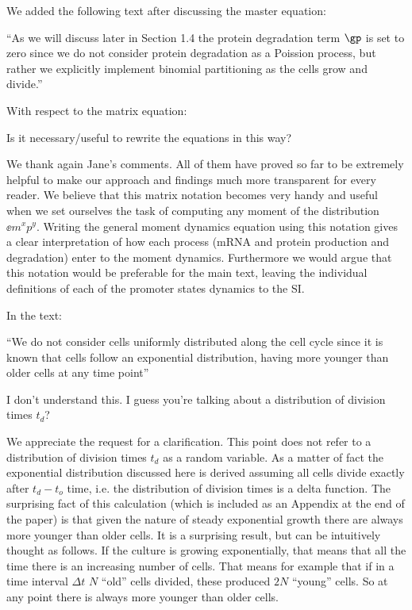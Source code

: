 We added the following text after discussing the master equation:

``As we will discuss later in Section 1.4 the protein degradation term $\gp$ is
set to zero since we do not consider protein degradation as a Poission process,
but rather we explicitly implement binomial partitioning as the cells grow and
divide.''

\begin{tcolorbox}
With respect to the matrix equation:

Is it necessary/useful to rewrite the equations in this way?
\end{tcolorbox}

We thank again Jane's comments. All of them have proved so far to be extremely
helpful to make our approach and findings much more transparent for every
reader. We believe that this matrix notation becomes very handy and useful when
we set ourselves the task of computing any moment of the distribution $\ee{m^x
p^y}$. Writing the general moment dynamics equation using this notation gives a
clear interpretation of how each process (mRNA and protein production and
degradation) enter to the moment dynamics. Furthermore we would argue that this
notation would be preferable for the main text, leaving the individual
definitions of each of the promoter states dynamics to the SI.

\begin{tcolorbox}
In the text:

``We do not consider cells uniformly distributed along the cell cycle since it
is known that cells follow an exponential distribution, having more younger than
older cells at any time point''

I don't understand this. I guess you're talking about a distribution of division
times $t_d$?
\end{tcolorbox}

We appreciate the request for a clarification. This point does not refer to a
distribution of division times $t_d$ as a random variable. As a matter of fact
the exponential distribution discussed here is derived assuming all cells divide
exactly after $t_d - t_o$ time, i.e. the distribution of division times is a
delta function. The surprising fact of this calculation (which is included as
an Appendix at the end of the paper) is that given the nature of steady
exponential  growth there are always more younger than older cells. It is a
surprising result, but can be intuitively thought as follows. If the culture is
growing exponentially, that means that all the time there is an increasing
number of cells. That means for example that if in a time interval $\Delta t$
$N$ ``old'' cells divided, these produced $2N$ ``young'' cells. So at any point
there is always more younger than older cells.

